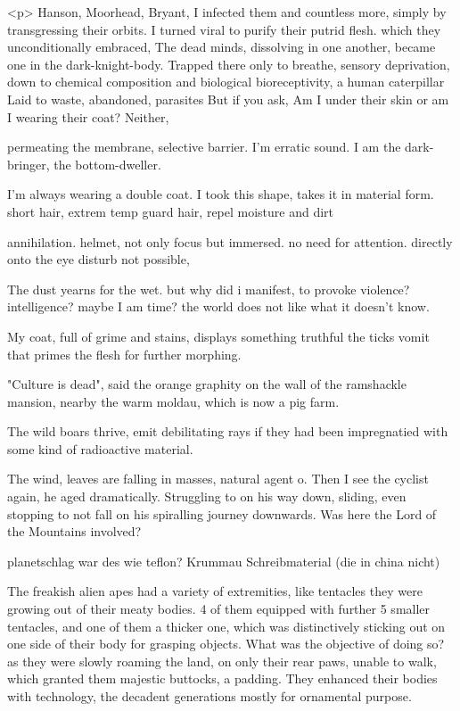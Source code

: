 \documentclass{article}
\begin{document}
<p>
Hanson, Moorhead, Bryant, 
I infected them and countless more, 
simply by transgressing their orbits.  
I turned viral to purify their putrid flesh. 
which they unconditionally embraced, 
The dead minds, dissolving in one another, 
 became one in the dark-knight-body.
Trapped there only to breathe, sensory deprivation, 
down to chemical composition and biological bioreceptivity,
a human caterpillar
Laid to waste, abandoned, parasites
But if you ask, 
Am I under their skin
or am I wearing their coat?
Neither, 

permeating the membrane, selective barrier. 
I'm erratic sound. 
I am the dark-bringer, the bottom-dweller. 

I'm always wearing a double coat. 
I took this shape, takes it in material form. 
short hair, extrem temp
guard hair, repel moisture and dirt

annihilation. 
helmet, not only focus but immersed. 
no need for attention.
directly onto the eye
disturb not possible, 



The dust yearns for the wet. 
but why did i manifest, to provoke violence?
intelligence? maybe I am time?
the world does not like what it doesn't know.

My coat, full of grime and stains, displays something truthful
the ticks vomit 
that primes the flesh for further morphing. 

"Culture is dead", said the orange graphity on the wall of the ramshackle mansion, 
nearby the warm moldau, which is now a pig farm.

The wild boars thrive, 
emit debilitating rays if they had been impregnatied 
with some kind of radioactive material.


The wind, leaves are falling in masses, natural agent o.
Then I see the cyclist again, he aged dramatically. Struggling to 
on his way down, sliding, even stopping to not fall on his
spiralling journey downwards.
Was here the Lord of the Mountains involved?


planetschlag war des wie teflon?  Krummau Schreibmaterial (die in china nicht)


The freakish alien apes
had a variety of extremities, like tentacles they were
growing out of their meaty bodies. 
4 of them equipped with further 5 smaller tentacles,
and one of them a thicker one, which was distinctively sticking out
on one side of their body
for grasping objects. What was the objective of doing so?
as they were slowly roaming the land, 
on only their rear paws, unable to walk,
which granted them  majestic buttocks,
a padding.
They enhanced their bodies with technology, 
the decadent generations mostly for ornamental purpose.
\end{document}
